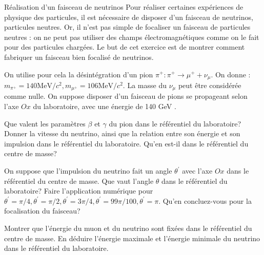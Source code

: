 \begin{exo}[PC][1][colle]{Réalisation d'un faisceau de neutrinos}
Pour réaliser certaines expériences de physique des particules, il est nécessaire de disposer d'un faisceau de neutrinos, particules neutres. Or, il n'est pas simple de focaliser un faisceau de particules neutres : on ne peut pas utiliser des champs électromagnétiques comme on le fait pour des particules chargées. Le but de cet exercice est de montrer comment fabriquer un faisceau bien focalisé de neutrinos.

On utilise pour cela la désintégration d'un pion $\pi^{+}: \pi^{+} \rightarrow \mu^{+}+\nu_\mu$. On donne : $m_{\pi^{+}}=140 \mathrm{MeV} / c^2, m_{\mu^{+}}=106 \mathrm{MeV} / c^2$. La masse du $\nu_\mu$ peut être considérée comme nulle. On suppose disposer d'un faisceau de pions se propageant selon l'axe $O x$ du laboratoire, avec une énergie de 140 GeV .
\begin{quest}
  \item Que valent les paramètres $\beta$ et $\gamma$ du pion dans le référentiel du laboratoire? Donner la vitesse du neutrino, ainsi que la relation entre son énergie et son impulsion dans le référentiel du laboratoire. Qu'en est-il dans le référentiel du centre de masse?
  \item On suppose que l'impulsion du neutrino fait un angle $\theta^{\prime}$ avec l'axe $O x$ dans le référentiel du centre de masse. Que vaut l'angle $\theta$ dans le référentiel du laboratoire? Faire l'application numérique pour $\theta^{\prime}=\pi / 4, \theta^{\prime}=\pi / 2, \theta^{\prime}=3 \pi / 4, \theta^{\prime}=99 \pi / 100, \theta^{\prime}=\pi$. Qu'en concluez-vous pour la focalisation du faisceau?
  \item Montrer que l'énergie du muon et du neutrino sont fixées dans le référentiel du centre de masse. En déduire l'énergie maximale et l'énergie minimale du neutrino dans le référentiel du laboratoire.
\end{quest}
\end{exo}

